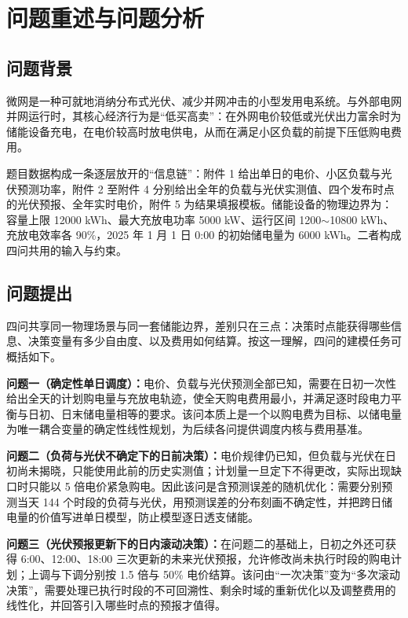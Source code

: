 \section{问题重述与问题分析}

\subsection{问题背景}

微网是一种可就地消纳分布式光伏、减少并网冲击的小型发用电系统。与外部电网并网运行时，其核心经济行为是``低买高卖''：在外网电价较低或光伏出力富余时为储能设备充电，在电价较高时放电供电，从而在满足小区负载的前提下压低购电费用。

题目数据构成一条逐层放开的``信息链''：附件 1 给出单日的电价、小区负载与光伏预测功率，附件 2 至附件 4 分别给出全年的负载与光伏实测值、四个发布时点的光伏预报、全年实时电价，附件 5 为结果填报模板。储能设备的物理边界为：容量上限 12000 kWh、最大充放电功率 5000 kW、运行区间 1200$\sim$10800 kWh、充放电效率各 90\%，2025 年 1 月 1 日 0:00 的初始储电量为 6000 kWh。二者构成四问共用的输入与约束。

\subsection{问题提出}

四问共享同一物理场景与同一套储能边界，差别只在三点：决策时点能获得哪些信息、决策变量有多少自由度、以及费用如何结算。按这一理解，四问的建模任务可概括如下。

\textbf{问题一（确定性单日调度）：}电价、负载与光伏预测全部已知，需要在日初一次性给出全天的计划购电量与充放电轨迹，使全天购电费用最小，并满足逐时段电力平衡与日初、日末储电量相等的要求。该问本质上是一个以购电费为目标、以储电量为唯一耦合变量的确定性线性规划，为后续各问提供调度内核与费用基准。

\textbf{问题二（负荷与光伏不确定下的日前决策）：}电价规律仍已知，但负载与光伏在日初尚未揭晓，只能使用此前的历史实测值；计划量一旦定下不得更改，实际出现缺口时只能以 5 倍电价紧急购电。因此该问是含预测误差的随机优化：需要分别预测当天 144 个时段的负荷与光伏，用预测误差的分布刻画不确定性，并把跨日储电量的价值写进单日模型，防止模型逐日透支储能。

\textbf{问题三（光伏预报更新下的日内滚动决策）：}在问题二的基础上，日初之外还可获得 6:00、12:00、18:00 三次更新的未来光伏预报，允许修改尚未执行时段的购电计划；上调与下调分别按 1.5 倍与 50\% 电价结算。该问由``一次决策''变为``多次滚动决策''，需要处理已执行时段的不可回溯性、剩余时域的重新优化以及调整费用的线性化，并回答引入哪些时点的预报才值得。


